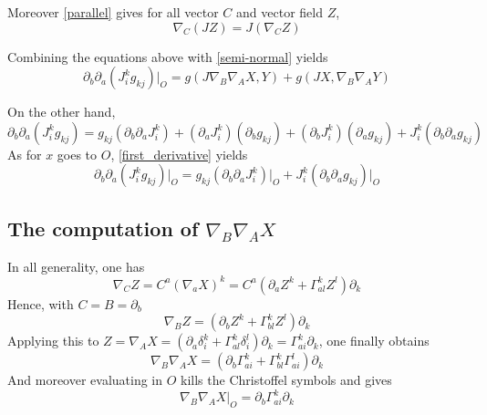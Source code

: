 \documentclass[11pt,makeidx]{amsart}%
\numberwithin{equation}{subsection}
\begin{document}
Moreover \eqref{parallel} gives for all vector $C$ and vector field $Z$,
\begin{equation}\label{nablaJZ}
\nabla_C (J Z ) = J (\nabla_C Z)
\end{equation}

Combining the equations above with \eqref{semi-normal} yields
\begin{equation}\label{righthandside}
\partial_b \partial_a \left( J^k_i g_{kj} \right) \vert_O = g\left( J\nabla_B\nabla_A X, Y \right) +  g\left(JX, \nabla_B\nabla_AY \right)
\end{equation}

On the other hand, 
\begin{equation}
\partial_b \partial_a \left( J^k_i g_{kj} \right) = 
g_{kj} \left(\partial_b \partial_a J^k_i\right)
+ \left( \partial_a J^k_i \right) \left(\partial_b g_{kj} \right)
+ \left( \partial_b J^k_i \right) \left(\partial_a g_{kj} \right)
+ J^k_i \left(\partial_b \partial_a g_{kj}\right)
\end{equation}
As for $x$ goes to $O$, \eqref{first_derivative} yields
\begin{equation}\label{lefthandside}
\partial_b \partial_a \left( J^k_i g_{kj} \right)\vert_O = 
g_{kj} \left(\partial_b \partial_a J^k_i\right)\vert_O 
+ J^k_i \left(\partial_b \partial_a g_{kj}\right)\vert_O
\end{equation}

\subsection{The computation of $\nabla_B \nabla_A X$}
In all generality, one has
\begin{equation}\label{Christoffel}
\nabla_C Z = C^a \left(\nabla_a X\right)^k = C^a\left(\partial_a Z^k + \Gamma^k_{al} Z^l \right)\partial_k
\end{equation}
Hence, with $C=B= \partial_b$
\begin{equation}
\nabla_B Z = \left(\partial_b Z^k + \Gamma^k_{bl} Z^l \right)\partial_k
\end{equation}
Applying this to $Z = \nabla_A X=\left(\partial_a \delta^k_i + \Gamma^k_{al} \delta^l_i \right)\partial_k = \Gamma^k_{ai}\partial_k$, one finally obtains
\begin{equation}
\nabla_B \nabla_A X = \left( \partial_b \Gamma^k_{ai} + \Gamma^k_{bl}\Gamma^l_{ai} \right) \partial_k
\end{equation}
And moreover evaluating in $O$ kills the Christoffel symbols and gives
\begin{equation}\label{nablaBAX}
\nabla_B \nabla_A X \vert_O = \partial_b \Gamma^k_{ai} \partial_k
\end{equation}
\end{document}
